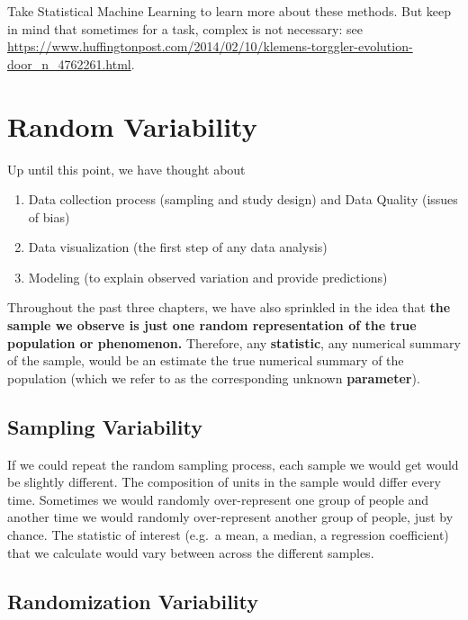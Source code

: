 \documentclass[]{book}
\providecommand{\tightlist}{%
  \setlength{\itemsep}{0pt}\setlength{\parskip}{0pt}}
\begin{document}
Take Statistical Machine Learning to learn more about these methods. But keep in mind that sometimes for a task, complex is not necessary: see \url{https://www.huffingtonpost.com/2014/02/10/klemens-torggler-evolution-door_n_4762261.html}.

\hypertarget{random-variability}{%
\chapter{Random Variability}\label{random-variability}}

Up until this point, we have thought about

\begin{enumerate}
\def\labelenumi{\arabic{enumi}.}
\tightlist
\item
  Data collection process (sampling and study design) and Data Quality (issues of bias)
\item
  Data visualization (the first step of any data analysis)
\item
  Modeling (to explain observed variation and provide predictions)
\end{enumerate}

Throughout the past three chapters, we have also sprinkled in the idea that \textbf{the sample we observe is just one random representation of the true population or phenomenon.} Therefore, any \textbf{statistic}, any numerical summary of the sample, would be an estimate the true numerical summary of the population (which we refer to as the corresponding unknown \textbf{parameter}).

\hypertarget{sampling-variability}{%
\section{Sampling Variability}\label{sampling-variability}}

If we could repeat the random sampling process, each sample we would get would be slightly different. The composition of units in the sample would differ every time. Sometimes we would randomly over-represent one group of people and another time we would randomly over-represent another group of people, just by chance. The statistic of interest (e.g.~a mean, a median, a regression coefficient) that we calculate would vary between across the different samples.

\hypertarget{randomization-variability}{%
\section{Randomization Variability}\label{randomization-variability}}
\end{document}
